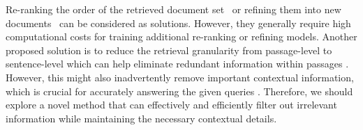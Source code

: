 Re-ranking the order of the retrieved document set~\cite{monot5, llm-rerank} or refining them into new documents~\cite{filco,recomp} can be considered as solutions. 
However, they generally require high computational costs for training additional re-ranking or refining models.
Another proposed solution is to reduce the retrieval granularity from passage-level to sentence-level which can help eliminate redundant information within passages \cite{phrase_retriever, denseXretrieval}.
However, this might also inadvertently remove important contextual information, which is crucial for accurately answering the given queries \cite{decontextualization}.
Therefore, we should explore a novel method that can effectively and efficiently filter out irrelevant information while maintaining the necessary contextual details.
